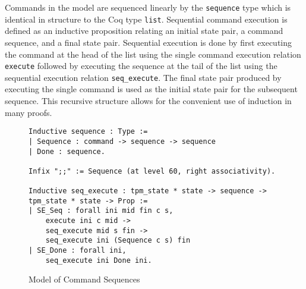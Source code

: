 Commands in the model are sequenced linearly by the \verb|sequence| type which is identical in structure to the Coq type \verb|list|. Sequential command execution is defined as an inductive proposition relating an initial state pair, a command sequence, and a final state pair. Sequential execution is done by first executing the command at the head of the list using the single command execution relation \verb|execute| followed by executing the sequence at the tail of the list using the sequential execution relation \verb|seq_execute|. The final state pair produced by executing the single command is used as the initial state pair for the subsequent sequence. This recursive structure allows for the convenient use of induction in many proofs.
\begin{figure}[h]
\begin{lstlisting}[language=Coq]
Inductive sequence : Type :=
| Sequence : command -> sequence -> sequence
| Done : sequence.

Infix ";;" := Sequence (at level 60, right associativity).

Inductive seq_execute : tpm_state * state -> sequence -> tpm_state * state -> Prop :=
| SE_Seq : forall ini mid fin c s,
    execute ini c mid ->
    seq_execute mid s fin ->
    seq_execute ini (Sequence c s) fin
| SE_Done : forall ini,
    seq_execute ini Done ini.
\end{lstlisting}
\caption{Model of Command Sequences}
\end{figure}

